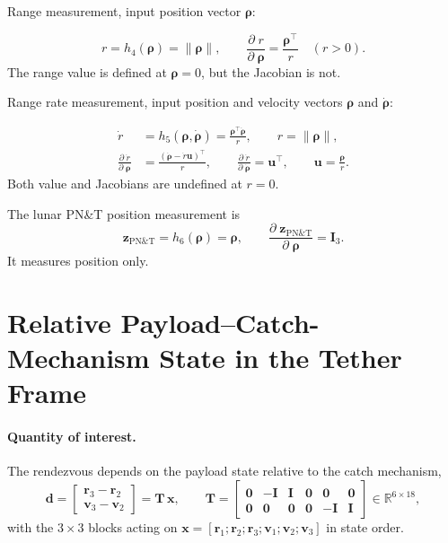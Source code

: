\documentclass[]{article}
\newcommand{\pd}[2]{\frac{\partial\;#1}{\partial\;#2}}
\newcommand{\x}{\bm{x}}
\newcommand{\Id}{\mathbf{I}}
\begin{document}
Range measurement, input position vector $\boldsymbol{\rho}$:

\begin{equation}
  r = h_4(\boldsymbol{\rho}) = \|\boldsymbol{\rho}\|,\qquad
  \pd{r}{\boldsymbol{\rho}} = \frac{\boldsymbol{\rho}^\top}{r}
  \quad(r>0).
  \label{eq:measurement-range}
\end{equation}
The range value is defined at $\boldsymbol{\rho}=0$, but the Jacobian is not.

Range rate measurement, input position and velocity vectors
$\boldsymbol{\rho}$ and $\dot{\boldsymbol{\rho}}$:

\begin{align}
  \dot{r} &= h_5(\boldsymbol{\rho},\dot{\boldsymbol{\rho}})
    = \frac{\boldsymbol{\rho}^\top\dot{\boldsymbol{\rho}}}{r},
    \qquad r=\|\boldsymbol{\rho}\|, \\
  \pd{\dot{r}}{\boldsymbol{\rho}}
    &= \frac{(\dot{\boldsymbol{\rho}}-\dot{r}\mathbf{u})^\top}{r},
  \qquad
  \pd{\dot{r}}{\dot{\boldsymbol{\rho}}}=\mathbf{u}^\top,
  \qquad \mathbf{u}=\frac{\boldsymbol{\rho}}{r}.
  \label{eq:measurement-range-rate}
\end{align}
Both value and Jacobians are undefined at $r=0$.

The lunar PN\&T position measurement is
\begin{equation}
  \mathbf{z}_{\mathrm{PN\&T}}=h_6(\boldsymbol{\rho})
  =\boldsymbol{\rho},\qquad
  \pd{\mathbf{z}_{\mathrm{PN\&T}}}{\boldsymbol{\rho}}=\mathbf{I}_3.
  \label{eq:measurement-pnt}
\end{equation}
It measures position only.

\section{Relative Payload--Catch-Mechanism State in the Tether Frame}
\label{sec:relative-state}

\paragraph{Quantity of interest.}
The rendezvous depends on the payload state relative to the catch mechanism,
\begin{equation}
  \bm{d} = \begin{bmatrix} \mathbf{r}_3 - \mathbf{r}_2 \\ \mathbf{v}_3 - \mathbf{v}_2 \end{bmatrix}
         = \mathbf{T}\,\x, \qquad
  \mathbf{T} = \begin{bmatrix}
    \mathbf{0} & -\Id & \Id & \mathbf{0} & \mathbf{0} & \mathbf{0} \\
    \mathbf{0} & \mathbf{0} & \mathbf{0} & \mathbf{0} & -\Id & \Id
  \end{bmatrix} \in \mathbb{R}^{6\times 18},
  \label{eq:relative-state}
\end{equation}
with the $3\times3$ blocks acting on $\x=[\mathbf{r}_1;\mathbf{r}_2;\mathbf{r}_3;
\mathbf{v}_1;\mathbf{v}_2;\mathbf{v}_3]$ in state order.
\end{document}
